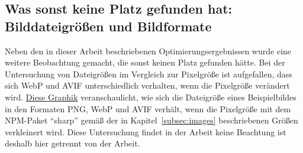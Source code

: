 \documentclass[11pt,a4paper]{article}
\begin{document}
\begin{landscape}
\section*{Was sonst keine Platz gefunden hat: Bilddateigrößen und Bildformate}
\begin{multicols}{2}
  Neben den in dieser Arbeit beschriebenen Optimierungsergebnissen wurde eine weitere Beobachtung gemacht, die sonst keinen Platz gefunden hätte.
  Bei der Untersuchung von Dateigrößen im Vergleich zur Pixelgröße ist aufgefallen, dass sich WebP und AVIF unterschiedlich verhalten, wenn die Pixelgröße verändert wird.
  \href{https://quickchart.io/chart?w=400&h=400&c=%7B%0A%20%20type%3A%20%27line%27%2C%0A%20%20data%3A%20%7B%0A%20%20%20%20labels%3A%20%5B%0A%20%20%20%20%20%20%27Original%20(1900%20px)%27%2C%0A%20%20%20%20%20%20%27%401%20(1600%20px)%27%2C%0A%20%20%20%20%20%20%27%402%20(1280%20px)%27%2C%0A%20%20%20%20%20%20%27%403%20(960%20px)%27%2C%0A%20%20%20%20%20%20%27%404%20(640%20px)%27%2C%0A%20%20%20%20%20%20%27%405%20(320%20px)%27%2C%0A%20%20%20%20%5D%2C%0A%20%20%20%20datasets%3A%20%5B%0A%20%20%20%20%20%20%7B%0A%20%20%20%20%20%20%20%20label%3A%20%27PNG%27%2C%0A%20%20%20%20%20%20%20%20data%3A%20%5B689%2C2747%2C1743%2C972%2C443%2C130%5D%2C%0A%20%20%20%20%20%20%20%20backgroundColor%3A%20%27%23c4a7e755%27%2C%0A%20%20%20%20%20%20%20%20borderColor%3A%20%27%23c4a7e7%27%2C%0A%20%20%20%20%20%20%7D%2C%0A%20%20%20%20%20%20%7B%0A%20%20%20%20%20%20%20%20label%3A%20%27WebP%27%2C%0A%20%20%20%20%20%20%20%20data%3A%20%5B126%2C71%2C56%2C41%2C23%2C10%5D%2C%0A%20%20%20%20%20%20%20%20backgroundColor%3A%20%27%230400ff55%27%2C%0A%20%20%20%20%20%20%20%20borderColor%3A%20%27%230400ff%27%2C%0A%20%20%20%20%20%20%7D%2C%0A%20%20%20%20%20%20%7B%0A%20%20%20%20%20%20%20%20label%3A%20%27AVIF%27%2C%0A%20%20%20%20%20%20%20%20data%3A%20%5B374%2C36%2C28%2C20%2C13%2C6%5D%2C%0A%20%20%20%20%20%20%20%20backgroundColor%3A%20%27%23ffaa0055%27%2C%0A%20%20%20%20%20%20%20%20borderColor%3A%20%27%23ffaa00%27%2C%0A%20%20%20%20%20%20%7D%2C%0A%20%20%20%20%5D%2C%0A%20%20%7D%2C%0A%20%20options%3A%20%7B%0A%20%20%20%20scales%3A%20%7B%0A%20%20%20%20%20%20xAxes%3A%20%5B%7B%20scaleLabel%3A%20%7B%20display%3A%20true%2C%20labelString%3A%20%27Bildbreite%27%20%7D%20%7D%5D%2C%0A%20%20%20%20%20%20yAxes%3A%20%5B%7B%20scaleLabel%3A%20%7B%20display%3A%20true%2C%20labelString%3A%20%27kB%27%20%7D%20%7D%5D%2C%0A%20%20%20%20%7D%2C%0A%20%20%7D%2C%0A%7D}
  {Diese Graphik} veranschaulicht, wie sich die Dateigröße eines Beispielbildes in den Formaten PNG, WebP und AVIF verhält, wenn die Pixelgröße mit dem NPM-Paket \enquote{sharp} gemäß der in Kapitel~\ref{subsec:images} beschriebenen Größen verkleinert wird.
  Diese Untersuchung findet in der Arbeit keine Beachtung ist deshalb hier getrennt von der Arbeit.
\end{multicols}

\end{landscape}
  
\end{document}
